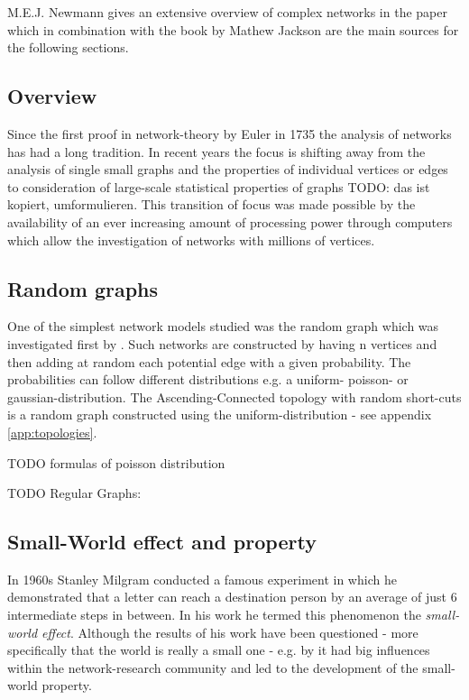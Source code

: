 \documentclass[../Bachelorarbeit.tex]{subfiles}
\begin{document}
M.E.J. Newmann gives an extensive overview of complex networks in the paper \cite{Newman_ComplexNetworks} which in combination with the book by Mathew Jackson \cite{Jackson2008} are the main sources for the following sections.

\subsection{Overview}
Since the first proof in network-theory by Euler in 1735 the analysis of networks has had a long tradition. In recent years the focus is shifting away from the analysis of single small graphs and the properties of individual vertices or edges to consideration of large-scale statistical properties of graphs TODO: das ist kopiert, umformulieren. This transition of focus was made possible by the availability of an ever increasing amount of processing power through computers which allow the investigation of networks with millions of vertices.

\subsection{Random graphs}
One of the simplest network models studied was the random graph which was investigated first by \cite{ErdosRenyi_RandomGraphs}. Such networks are constructed by having n vertices and then adding at random each potential edge with a given probability. The probabilities can follow different distributions e.g. a uniform- poisson- or gaussian-distribution. The Ascending-Connected topology with random short-cuts is a random graph constructed using the uniform-distribution - see appendix \ref{app:topologies}. 

TODO formulas of poisson distribution

TODO Regular Graphs: \citep[vgl.]{BarabasiAlbert_StatisticalMechanics} \citep[vgl.]{Newman_ComplexNetworks}

\subsection{Small-World effect and property}
In 1960s Stanley Milgram conducted a famous experiment in which he demonstrated that a letter can reach a destination person by an average of just 6 intermediate steps in between. In his work \cite{TraverMilgram_StudySmallWorld} \citep{Milgram_SmallWorld} he termed this phenomenon the \textit{small-world effect}. Although the results of his work have been questioned - more specifically that the world is really a small one - e.g. by \cite{Kleinfeld_BigWorld} it had big influences within the network-research community and led to the development of the small-world property.
\end{document}
